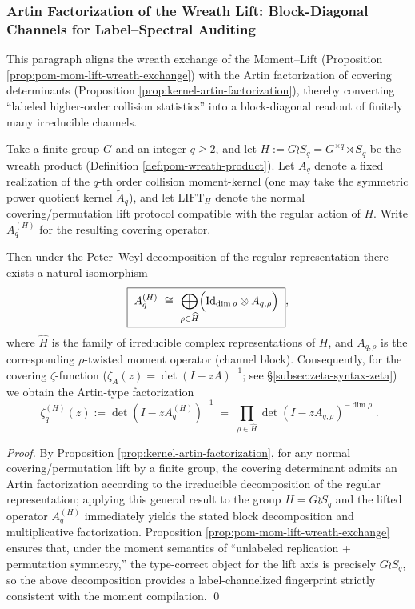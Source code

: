 \subsubsection{Artin Factorization of the Wreath Lift: Block-Diagonal Channels for Label--Spectral Auditing}\label{subsubsec:pom-wreath-artin-factorization}
This paragraph aligns the wreath exchange of the Moment--Lift (Proposition \ref{prop:pom-mom-lift-wreath-exchange}) with the Artin factorization of covering determinants (Proposition \ref{prop:kernel-artin-factorization}),
thereby converting ``labeled higher-order collision statistics'' into a block-diagonal readout of finitely many irreducible channels.

\begin{corollary}\label{cor:pom-wreath-artin-factorization}
Take a finite group \(G\) and an integer \(q\ge 2\), and let \(H:=G\wr S_q=G^{\times q}\rtimes S_q\) be the wreath product (Definition \ref{def:pom-wreath-product}).
Let \(A_q\) denote a fixed realization of the \(q\)-th order collision moment-kernel (one may take the symmetric power quotient kernel \(\widetilde A_q\)), and let \(\mathrm{LIFT}_H\) denote the normal covering/permutation lift protocol compatible with the regular action of \(H\).
Write \(A_q^{(H)}\) for the resulting covering operator.

Then under the Peter--Weyl decomposition of the regular representation there exists a natural isomorphism
\[
\boxed{\;
A_q^{(H)}\ \cong\ \bigoplus_{\rho\in\widehat H}
\Bigl(\mathrm{Id}_{\dim\rho}\otimes A_{q,\rho}\Bigr)\; },
\]
where \(\widehat H\) is the family of irreducible complex representations of \(H\), and \(A_{q,\rho}\) is the corresponding \(\rho\)-twisted moment operator (channel block).
Consequently, for the covering \(\zeta\)-function (\(\zeta_{A}(z)=\det(I-zA)^{-1}\); see \S\ref{subsec:zeta-syntax-zeta}) we obtain the Artin-type factorization
\[
\boxed{\;
\zeta_{q}^{(H)}(z)
:=\det(I-zA_q^{(H)})^{-1}
\;=\;
\prod_{\rho\in\widehat H}\det(I-zA_{q,\rho})^{-\dim\rho}\; }.
\]
\end{corollary}
\begin{proof}
By Proposition \ref{prop:kernel-artin-factorization}, for any normal covering/permutation lift by a finite group, the covering determinant admits an Artin factorization according to the irreducible decomposition of the regular representation;
applying this general result to the group \(H=G\wr S_q\) and the lifted operator \(A_q^{(H)}\) immediately yields the stated block decomposition and multiplicative factorization.
Proposition \ref{prop:pom-mom-lift-wreath-exchange} ensures that, under the moment semantics of ``unlabeled replication + permutation symmetry,'' the type-correct object for the lift axis is precisely \(G\wr S_q\), so the above decomposition provides a label-channelized fingerprint strictly consistent with the moment compilation. \qed
\end{proof}

